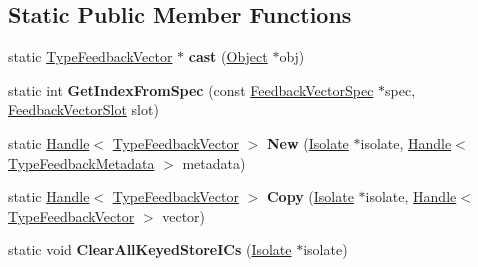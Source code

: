 \subsection*{Static Public Member Functions}
\begin{DoxyCompactItemize}
\item 
static \hyperlink{classv8_1_1internal_1_1_type_feedback_vector}{Type\+Feedback\+Vector} $\ast$ {\bfseries cast} (\hyperlink{classv8_1_1internal_1_1_object}{Object} $\ast$obj)\hypertarget{classv8_1_1internal_1_1_type_feedback_vector_af61fd5059ea380cf9883c37f10c74208}{}\label{classv8_1_1internal_1_1_type_feedback_vector_af61fd5059ea380cf9883c37f10c74208}

\item 
static int {\bfseries Get\+Index\+From\+Spec} (const \hyperlink{classv8_1_1internal_1_1_feedback_vector_spec}{Feedback\+Vector\+Spec} $\ast$spec, \hyperlink{classv8_1_1internal_1_1_feedback_vector_slot}{Feedback\+Vector\+Slot} slot)\hypertarget{classv8_1_1internal_1_1_type_feedback_vector_acc3d5d03278b238c8de32a5b097ecf8e}{}\label{classv8_1_1internal_1_1_type_feedback_vector_acc3d5d03278b238c8de32a5b097ecf8e}

\item 
static \hyperlink{classv8_1_1internal_1_1_handle}{Handle}$<$ \hyperlink{classv8_1_1internal_1_1_type_feedback_vector}{Type\+Feedback\+Vector} $>$ {\bfseries New} (\hyperlink{classv8_1_1internal_1_1_isolate}{Isolate} $\ast$isolate, \hyperlink{classv8_1_1internal_1_1_handle}{Handle}$<$ \hyperlink{classv8_1_1internal_1_1_type_feedback_metadata}{Type\+Feedback\+Metadata} $>$ metadata)\hypertarget{classv8_1_1internal_1_1_type_feedback_vector_ab56f736c71e3ab9bb984e3c2dc175494}{}\label{classv8_1_1internal_1_1_type_feedback_vector_ab56f736c71e3ab9bb984e3c2dc175494}

\item 
static \hyperlink{classv8_1_1internal_1_1_handle}{Handle}$<$ \hyperlink{classv8_1_1internal_1_1_type_feedback_vector}{Type\+Feedback\+Vector} $>$ {\bfseries Copy} (\hyperlink{classv8_1_1internal_1_1_isolate}{Isolate} $\ast$isolate, \hyperlink{classv8_1_1internal_1_1_handle}{Handle}$<$ \hyperlink{classv8_1_1internal_1_1_type_feedback_vector}{Type\+Feedback\+Vector} $>$ vector)\hypertarget{classv8_1_1internal_1_1_type_feedback_vector_add763ff09f3238a52152063c3785295a}{}\label{classv8_1_1internal_1_1_type_feedback_vector_add763ff09f3238a52152063c3785295a}

\item 
static void {\bfseries Clear\+All\+Keyed\+Store\+I\+Cs} (\hyperlink{classv8_1_1internal_1_1_isolate}{Isolate} $\ast$isolate)\hypertarget{classv8_1_1internal_1_1_type_feedback_vector_ae17915f0e43616977ae10a1607df182c}{}\label{classv8_1_1internal_1_1_type_feedback_vector_ae17915f0e43616977ae10a1607df182c}


\end{DoxyCompactItemize}
